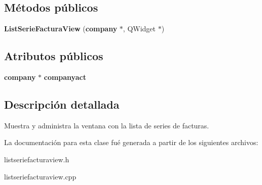 \subsection*{M\'{e}todos p\'{u}blicos}
\begin{CompactItemize}
\item 
{\bf List\-Serie\-Factura\-View} ({\bf company} $\ast$, QWidget $\ast$)\label{classListSerieFacturaView_a0}

\end{CompactItemize}
\subsection*{Atributos p\'{u}blicos}
\begin{CompactItemize}
\item 
{\bf company} $\ast$ {\bf companyact}\label{classListSerieFacturaView_o0}

\end{CompactItemize}


\subsection{Descripci\'{o}n detallada}
Muestra y administra la ventana con la lista de series de facturas. 



La documentaci\'{o}n para esta clase fu\'{e} generada a partir de los siguientes archivos:\begin{CompactItemize}
\item 
listseriefacturaview.h\item 
listseriefacturaview.cpp\end{CompactItemize}
